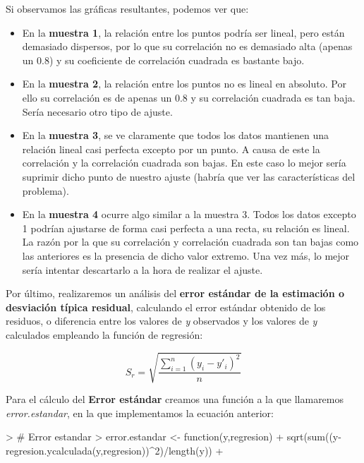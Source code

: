 \documentclass [a4paper] {article}
\begin{document}
Si observamos las gráficas resultantes, podemos ver que:
\begin{itemize}
    \item En la \textbf{muestra 1}, la relación entre los puntos podría ser lineal, pero
	están demasiado dispersos, por lo que su correlación no es demasiado alta (apenas un 0.8) y su
	coeficiente de correlación cuadrada es bastante bajo.\\
    \item En la \textbf{muestra 2}, la relación entre los puntos no es lineal en absoluto. Por ello
	su correlación es de apenas un 0.8 y su correlación cuadrada es tan baja. Sería necesario otro tipo
	de ajuste.\\
    \item En la \textbf{muestra 3}, se ve claramente que todos los datos mantienen una relación lineal
	casi perfecta excepto por un punto. A causa de este la correlación y la correlación cuadrada son bajas.
	En este caso lo mejor sería suprimir dicho punto de nuestro ajuste (habría que ver las características
	del problema).\\
    \item En la \textbf{muestra 4} ocurre algo similar a la muestra 3. Todos los datos excepto 1 podrían
	ajustarse de forma casi perfecta a una recta, su relación es lineal. La razón por la que su correlación
	y correlación cuadrada son tan bajas como las anteriores es la presencia de dicho valor extremo. Una vez
	más, lo mejor sería intentar descartarlo a la hora de realizar el ajuste.\\
\end{itemize}


Por último, realizaremos un análisis del \textbf{error estándar de la estimación o desviación típica
residual}, calculando el error estándar obtenido de los residuos, o diferencia entre los valores de
\textit{y} observados y los valores de \textit{y} calculados empleando la función de regresión:

\begin{equation*}
S_{r} = \sqrt{\frac{\sum_{i=1}^{n} (y_i - y'_i)^2}{n}}
\end{equation*}

Para el cálculo del \textbf{Error estándar} creamos una función a la que llamaremos
\textit{error.estandar}, en la que implementamos la ecuación anterior:
\begin{Schunk}
\begin{Sinput}
> # Error estandar
> error.estandar <- function(y,regresion){
+   sqrt(sum((y-regresion.ycalculada(y,regresion))^2)/length(y))
+ }
\end{Sinput}
\end{Schunk}
\end{document}

